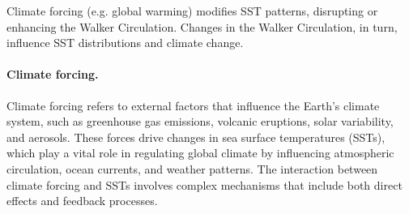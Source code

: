 Climate forcing (e.g. global warming) modifies SST patterns, disrupting or enhancing the Walker Circulation. Changes in the Walker Circulation, in turn, influence SST distributions and climate change.


\paragraph{Climate forcing.}
Climate forcing refers to external factors that influence the Earth’s climate system, such as greenhouse gas emissions, volcanic eruptions, solar variability, and aerosols. These forces drive changes in sea surface temperatures (SSTs), which play a vital role in regulating global climate by influencing atmospheric circulation, ocean currents, and weather patterns. The interaction between climate forcing and SSTs involves complex mechanisms that include both direct effects and feedback processes.

